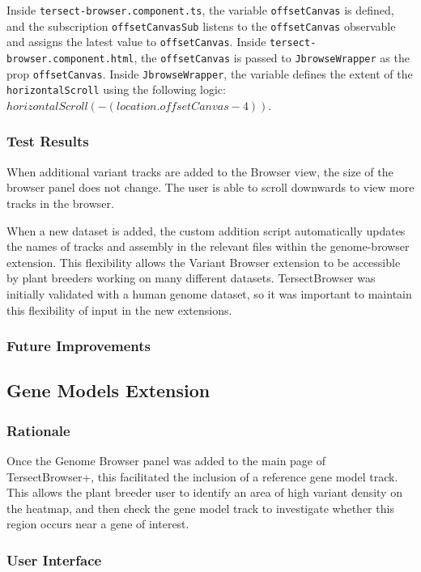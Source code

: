 \documentclass[12pt]{article}
\begin{document}
\begin{itemize}
Inside \verb +tersect-browser.component.ts+, the variable \verb +offsetCanvas+ is defined, and the subscription \verb +offsetCanvasSub+ listens to the  \verb +offsetCanvas+ observable and assigns the latest value to \verb +offsetCanvas+. Inside \verb +tersect-browser.component.html+, the \verb +offsetCanvas+ is passed to \verb +JbrowseWrapper+ as the prop \verb +offsetCanvas+. Inside \verb +JbrowseWrapper+, the variable defines the extent of the \verb +horizontalScroll+ using the following logic: $horizontalScroll(-(location.offsetCanvas - 4))$. 


\subsubsection{Test Results}
When additional variant tracks are added to the Browser view, the size of the browser panel does not change. The user is able to scroll downwards to view more tracks in the browser. 

When a new dataset is added, the custom addition script automatically updates the names of tracks and assembly in the relevant files within the genome-browser extension. This flexibility allows the Variant Browser extension to be accessible by plant breeders working on many different datasets. TersectBrowser was initially validated with a human genome dataset, so it was important to maintain this flexibility of input in the new extensions.

\subsubsection{Future Improvements}

\subsection{Gene Models Extension}
\label{sec:Models}
\subsubsection{Rationale}
Once the Genome Browser panel was added to the main page of TersectBrowser+, this facilitated the inclusion of a reference gene model track. This allows the plant breeder user to identify an area of high variant density on the heatmap, and then check the gene model track to investigate whether this region occurs near a gene of interest.

\subsubsection{User Interface}

\end{itemize}
\end{document}
